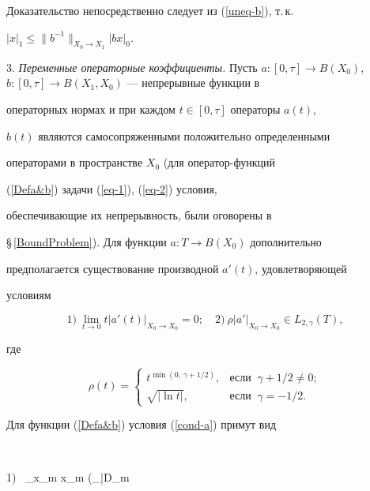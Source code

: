 Доказательство непосредственно следует из (\ref{uneq-b}), т.\,к.


$|x|_1 \le \|b^{-1}\|_{X_0 \to X_1}|b x|_0$.


\medskip





3. {\it Переменные операторные коэффициенты.} Пусть $a:[0,\tau]


\to B(X_0)$, $b:[0,\tau] \to B(X_1,X_0)$ --- непрерывные функции в


операторных нормах и при каждом $t \in [0,\tau]$ операторы $a(t)$,


$b(t)$ являются самосопряженными положительно определенными


операторами в пространстве $X_0$ (для оператор-функций


(\ref{Defa&b}) задачи (\ref{eq-1}), (\ref{eq-2}) условия,


обеспечивающие их непрерывность, были оговорены в


\S\,\ref{BoundProblem}). Для функции $a:T \to B(X_0)$ дополнительно


предполагается существование производной $a'(t)$, удовлетворяющей


условиям


\begin{equation}\label{cond-a}


1)\ \lim_{t \to 0} t |a'(t)|_{X_0 \to X_0} =0; \quad


2)\ \rho |a'|_{X_0 \to X_0} \in L_{2,\gamma}(T),


\end{equation}


где


$$


\rho(t)=


\begin{cases}


t^{\min(0,\,\gamma+1/2)}, & \text{если } \ \gamma+1/2 \ne 0;\\


\sqrt{|\ln t|}, & \text{если } \ \gamma=-1/2.


\end{cases}


$$


Для функции (\ref{Defa&b}) условия (\ref{cond-a}) примут вид


$$




1) \ \lim_{x_m } x_m \bigg(\int_\Omega |D_m


